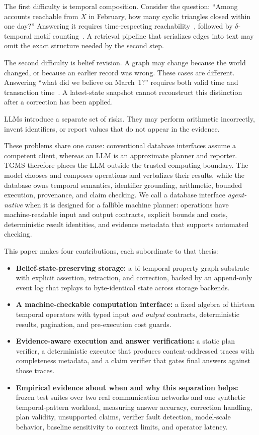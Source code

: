 \documentclass[11pt]{article}
\begin{document}
The first difficulty is temporal composition. Consider the question:
``Among accounts reachable from $X$ in February, how many cyclic
triangles closed within one day?'' Answering it requires
time-respecting reachability~\cite{wu2014path}, followed by
$\delta$-temporal motif counting~\cite{paranjape2017motifs}. A retrieval
pipeline that serializes edges into text may omit the exact structure
needed by the second step.

The second difficulty is belief revision. A graph may change because the
world changed, or because an earlier record was wrong. These cases are
different. Answering ``what did we believe on March~1?'' requires both
valid time and transaction time~\cite{snodgrass1999}. A latest-state
snapshot cannot reconstruct this distinction after a correction has been
applied.

LLMs introduce a separate set of risks. They may perform arithmetic
incorrectly, invent identifiers, or report values that do not appear in
the evidence.

These problems share one cause: conventional database interfaces assume
a competent client, whereas an LLM is an approximate planner and
reporter. TGMS therefore places the LLM outside the trusted computing
boundary. The model chooses and composes operations and verbalizes
their results, while the database owns temporal semantics, identifier
grounding, arithmetic, bounded execution, provenance, and claim
checking. We call a database interface \emph{agent-native} when it is
designed for a fallible machine planner: operations have
machine-readable input and output contracts, explicit bounds and costs,
deterministic result identities, and evidence metadata that supports
automated checking.

This paper makes four contributions, each subordinate to that thesis:
\begin{itemize}
    \item \textbf{Belief-state-preserving storage:} a bi-temporal
    property graph substrate with explicit assertion, retraction, and
    correction, backed by an append-only event log that replays to
    byte-identical state across storage backends.
    \item \textbf{A machine-checkable computation interface:} a fixed
    algebra of thirteen temporal operators with typed input \emph{and
    output} contracts, deterministic results, pagination, and
    pre-execution cost guards.
    \item \textbf{Evidence-aware execution and answer verification:} a
    static plan verifier, a deterministic executor that produces
    content-addressed traces with completeness metadata, and a claim
    verifier that gates final answers against those traces.
    \item \textbf{Empirical evidence about when and why this separation
    helps:} frozen test suites over two real communication networks and
    one synthetic temporal-pattern workload, measuring answer accuracy,
    correction handling, plan validity, unsupported claims, verifier
    fault detection, model-scale behavior, baseline sensitivity to
    context limits, and operator latency.
\end{itemize}
\end{document}
